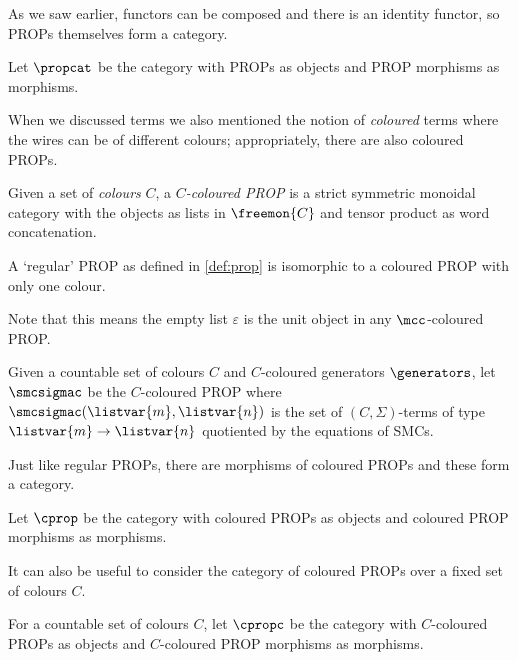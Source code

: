 As we saw earlier, functors can be composed and there is an identity functor,
so PROPs themselves form a category.

\begin{definition}
    Let \(\propcat\) be the category with PROPs as objects and PROP morphisms
    as morphisms.
\end{definition}

When we discussed terms we also mentioned the notion of \emph{coloured} terms
where the wires can be of different colours; appropriately, there are also
coloured PROPs.

\begin{definition}
    Given a set of \emph{colours} \(C\), a \emph{\(C\)-coloured PROP} is a strict
    symmetric monoidal category with the objects as lists in \(\freemon{C}\) and
    tensor product as word concatenation.
\end{definition}

\begin{remark}
    A `regular' PROP as defined in \cref{def:prop} is isomorphic to a
    coloured PROP with only one colour.
\end{remark}

Note that this means the empty list \(\varepsilon\) is the unit
object in any \(\mcc\)-coloured PROP.

\begin{definition}\label{def:freely-generated-coloured-prop}
    \index{\(\smcsigmac\)}
    Given a countable set of colours \(C\) and \(C\)-coloured generators
    \(\generators\), let \(\smcsigmac\) be the \(C\)-coloured PROP where
    \(\smcsigmac(\listvar{m}, \listvar{n})\) is the set of
    \((C,\Sigma)\)-terms of type \(\listvar{m} \to \listvar{n}\) quotiented by
    the equations of SMCs.
\end{definition}

Just like regular PROPs, there are morphisms of coloured PROPs and these form
a category.

\begin{definition}
    Let \(\cprop\) be the category with coloured PROPs as objects and coloured
    PROP morphisms as morphisms.
\end{definition}

It can also be useful to consider the category of coloured PROPs over a fixed
set of colours \(C\).

\begin{definition}
    For a countable set of colours \(C\), let \(\cpropc\) be the category with
    \(C\)-coloured PROPs as objects and \(C\)-coloured PROP morphisms as
    morphisms.
\end{definition}